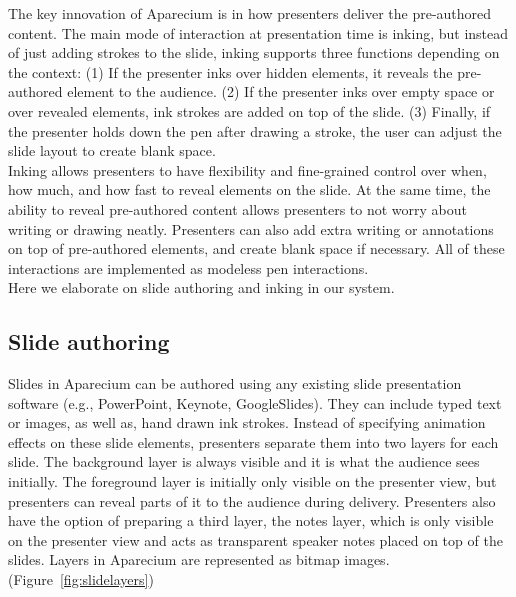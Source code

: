 The key innovation of Aparecium is in how presenters deliver the pre-authored content.  The main mode of interaction at presentation time is inking, but instead of just adding strokes to the slide, inking supports three functions depending on the context: (1) If the presenter inks over hidden elements, it reveals the pre-authored element to the audience. (2) If the presenter inks over empty space or over revealed elements, ink strokes are added on top of the slide. (3) Finally, if the presenter holds down the pen after drawing a stroke, the user can adjust the slide layout to create blank space.\\ 

Inking allows presenters to have flexibility and fine-grained control over when, how much, and how fast to reveal elements on the slide.
%
At the same time, the ability to reveal pre-authored content allows presenters to not worry about writing or drawing neatly.
%
Presenters can also add extra writing or annotations on top of pre-authored elements, and create blank space if necessary. 
%
All of these interactions are implemented as modeless pen interactions.\\

Here we elaborate on slide authoring and inking in our system.
\subsection{Slide authoring}
Slides in Aparecium can be authored using any existing slide presentation software (e.g., PowerPoint, Keynote, GoogleSlides). They can include typed text or images, as well as, hand drawn ink strokes. Instead of specifying animation effects on these slide elements, presenters separate them into two layers for each slide. The background layer is always visible and it is what the audience sees initially. The foreground layer is initially only visible on the presenter view, but presenters can reveal parts of it to the audience during delivery. Presenters also have the option of preparing a third layer, the notes layer, which is only visible on the presenter view and acts as transparent speaker notes placed on top of the slides. Layers in Aparecium are represented as bitmap images. (Figure~\ref{fig:slidelayers})

